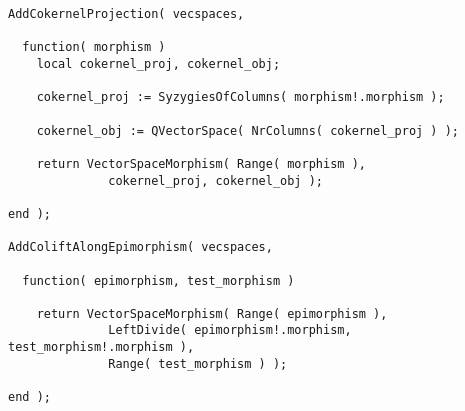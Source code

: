 \begin{small}
\begin{Verbatim}[frame=single]
AddCokernelProjection( vecspaces,

  function( morphism )
    local cokernel_proj, cokernel_obj;

    cokernel_proj := SyzygiesOfColumns( morphism!.morphism );

    cokernel_obj := QVectorSpace( NrColumns( cokernel_proj ) );

    return VectorSpaceMorphism( Range( morphism ), 
              cokernel_proj, cokernel_obj );

end );

AddColiftAlongEpimorphism( vecspaces,
  
  function( epimorphism, test_morphism )
    
    return VectorSpaceMorphism( Range( epimorphism ),
              LeftDivide( epimorphism!.morphism, test_morphism!.morphism ),
              Range( test_morphism ) );
    
end );
\end{Verbatim}
\end{small}